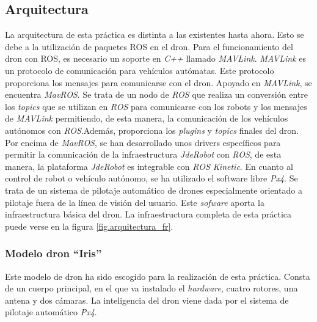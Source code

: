 
\subsection{Arquitectura}
La arquitectura de esta práctica es distinta a las existentes hasta ahora. Esto se debe a la utilización de paquetes ROS en el dron. Para el funcionamiento del dron con ROS, es necesario un soporte en \textit{C++} llamado \textit{MAVLink}. \textit{MAVLink} es un protocolo de comunicación para vehículos autómatas. Este protocolo proporciona los mensajes para comunicarse con el dron. Apoyado en \textit{MAVLink}, se encuentra \textit{MavROS}. Se trata de un nodo de \textit{ROS} que realiza un conversión entre los \textit{topics} que se utilizan en \textit{ROS} para comunicarse con los robots y los mensajes de \textit{MAVLink} permitiendo, de esta manera, la comunicación de los vehículos autónomos con \textit{ROS}.Además, proporciona los \textit{plugins} y \textit{topics} finales del dron. Por encima de \textit{MavROS}, se han desarrollado unos drivers específicos para permitir la comunicación de la infraestructura \textit{JdeRobot} con \textit{ROS}, de esta manera, la plataforma \textit{JdeRobot} es integrable con \textit{ROS Kinetic}.
En cuanto al control de robot o vehículo autónomo, se ha utilizado el software libre \textit{Px4}. Se trata de un sistema de pilotaje automático de drones especialmente orientado a pilotaje fuera de la línea de visión del usuario. Este \textit{sofware} aporta la infraestructura básica del dron.
La infraestructura completa de esta práctica puede verse en la figura \ref{fig.arquitectura_fr}.


\subsubsection{Modelo dron ``Iris''}
Este modelo de dron ha sido escogido para la realización de esta práctica. Consta de un cuerpo principal, en el que va instalado el \textit{hardware}, cuatro rotores, una antena y dos cámaras. La inteligencia del dron viene dada por el sistema de pilotaje automático \textit{Px4}.

